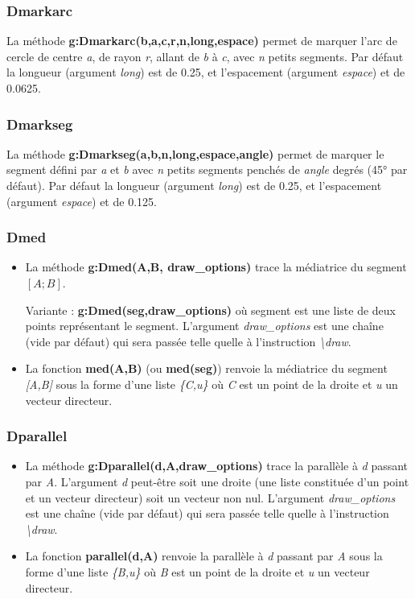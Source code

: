 \subsubsection{Dmarkarc}
La méthode \textbf{g:Dmarkarc(b,a,c,r,n,long,espace)} permet de marquer l'arc de cercle de centre \emph{a}, de rayon \emph{r}, allant de \emph{b} à \emph{c}, avec \emph{n} petits segments. Par défaut la longueur (argument \emph{long}) est de 0.25, et l'espacement (argument \emph{espace}) et de 0.0625.

\subsubsection{Dmarkseg}
La méthode \textbf{g:Dmarkseg(a,b,n,long,espace,angle)} permet de marquer le segment défini par \emph{a} et \emph{b} avec \emph{n} petits segments penchés de \emph{angle} degrés (45° par défaut). Par défaut la longueur (argument \emph{long}) est de 0.25, et l'espacement (argument \emph{espace}) et de 0.125.

\subsubsection{Dmed}
\begin{itemize}
    \item La méthode \textbf{g:Dmed(A,B, draw\_options)} trace la médiatrice du segment $[A;B]$.

  Variante : \textbf{g:Dmed(seg,draw\_options)} où segment est une liste de deux points représentant le segment. L'argument \emph{draw\_options} est une chaîne (vide par défaut) qui sera passée telle quelle à l'instruction \emph{\textbackslash draw}.
  \item La fonction \textbf{med(A,B)} (ou \textbf{med(seg)}) renvoie la médiatrice du segment \emph{{[}A,B{]}} sous la forme d'une liste \emph{\{C,u\}} où \emph{C} est un point de la droite et \emph{u} un vecteur directeur.
\end{itemize}

\subsubsection{Dparallel}
\begin{itemize}
    \item La méthode \textbf{g:Dparallel(d,A,draw\_options)} trace la parallèle à \emph{d} passant par \emph{A}. L'argument \emph{d} peut-être soit une droite (une liste constituée d'un point et un vecteur directeur) soit un vecteur non nul. L'argument \emph{draw\_options} est une chaîne (vide par défaut) qui sera passée telle quelle à l'instruction \emph{\textbackslash draw}.
    \item La fonction \textbf{parallel(d,A)} renvoie la parallèle à \emph{d} passant par \emph{A} sous la forme d'une liste \emph{\{B,u\}} où \emph{B} est un point de la droite et \emph{u} un vecteur directeur.
\end{itemize}


